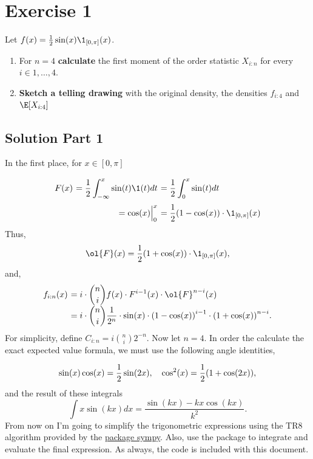 \section{Exercise 1}

Let $f(x) = \frac{1}{2}\sin(x) \1_{[0,\pi]}(x)$.
\begin{enumerate}
    \item For $n = 4$ \textbf{calculate} the first moment of the order statistic $X_{i:n}$ for every $i \in 1,\ldots, 4$.
    \item \textbf{Sketch a telling drawing} with the original density, the densities $f_{i:4}$ and $\E[X_{i:4}]$
\end{enumerate}

\subsection*{Solution Part 1}

In the first place, for $x \in [0,\pi]$
\[ \everymath{\displaystyle}
\arraycolsep=1.8pt\def\arraystretch{2.3}
\begin{array}{rrl}
    F(x) & = \frac{1}{2}\int_{-\infty}^{x}\sin(t)\1(t) dt & = \frac{1}{2}\int_{0}^{x}\sin(t) dt\\
    & = \cos(x) \Big|_{0}^x  & = \frac{1}{2}(1-\cos(x))\cdot \1_{[0,\pi]}(x)
\end{array} \]
Thus,
\[ \ol{F}(x) = \frac{1}{2}(1+\cos(x)) \cdot \1_{[0,\pi]}(x), \]
and,
\[ \everymath{\displaystyle}
\arraycolsep=1.8pt\def\arraystretch{1.8}
\begin{array}{rl}
    f_{i:n}(x) & = i \cdot \binom{n}{i} f(x) \cdot F^{i-1}(x) \cdot \ol{F}^{n-i}(x)\\
    & = i \cdot \binom{n}{i}\frac{1}{2^n} \cdot \sin(x) \cdot {(1-\cos(x))}^{i-1} \cdot {(1+\cos(x))}^{n-i}.
\end{array} \]
For simplicity, define $C_{i:n} = i \binom{n}{i}2^{-n}$. Now let $n = 4$. In order the calculate the exact expected value formula, we must use the following angle identities,

\[ \sin(x)\cos(x) = \frac{1}{2}\sin(2x),\hspace*{1em} \cos^2(x) = \frac{1}{2}(1+\cos(2x)), \]
and the result of these integrals
\[ \int x\sin(kx) dx = \frac{\sin(kx)-kx\cos(kx)}{k^2}.\]
From now on I'm going to simplify the trigonometric expressions using the TR8 algorithm provided by the \href{https://docs.sympy.org/latest/modules/simplify/fu.html#}{\underline{ package sympy}}. Also, use the package to integrate and evaluate the final expression. As always, the code is included with this document.


